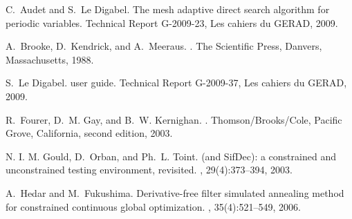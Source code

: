 \documentclass[12pt,english]{article}
\begin{document}

%

\begin{thebibliography}{1}

C.~Audet and S.~Le Digabel.
\newblock The mesh adaptive direct search algorithm for periodic variables.
\newblock Technical Report G-2009-23, Les cahiers du GERAD, 2009.

A.~Brooke, D.~Kendrick, and A.~Meeraus.
.
\newblock The Scientific Press, Danvers, Massachusetts, 1988.

S.~Le Digabel.
 user guide.
\newblock Technical Report G-2009-37, Les cahiers du GERAD, 2009.

R.~Fourer, D.~M. Gay, and B.~W. Kernighan.
.
\newblock Thomson/Brooks/Cole, Pacific Grove, California, second edition, 2003.

{N. I. M.} Gould, D.~Orban, and {Ph.}~L. Toint.
 (and {SifDec}): a constrained and unconstrained testing
  environment, revisited.
, 29(4):373--394,
  2003.

A.~Hedar and M.~Fukushima.
\newblock Derivative-free filter simulated annealing method for constrained
  continuous global optimization.
, 35(4):521--549, 2006.

\end{thebibliography}
\end{document}
